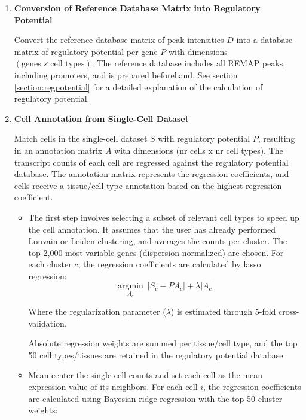 \begin{enumerate}
    \item \textbf{Conversion of Reference Database Matrix into Regulatory Potential}
    
    Convert the reference database matrix of peak intensities $D$ into a database matrix of regulatory potential\cite{Wang2016} per gene $P$ with dimensions $(\text{genes} \times \text{cell types})$. The reference database includes all REMAP peaks, including promoters, and is prepared beforehand. See section \ref{section:regpotential} for a detailed explanation of the calculation of regulatory potential.

    \item \textbf{Cell Annotation from Single-Cell Dataset}
    
    Match cells in the single-cell dataset $S$ with regulatory potential $P$, resulting in an annotation matrix $A$ with dimensions (nr cells x nr cell types). The transcript counts of each cell are regressed against the regulatory potential database. The annotation matrix represents the regression coefficients, and cells receive a tissue/cell type annotation based on the highest regression coefficient.
    
    \begin{itemize}
        \item The first step involves selecting a subset of relevant cell types to speed up the cell annotation. It assumes that the user has already performed Louvain or Leiden clustering, and averages the counts per cluster. The top 2,000 most variable genes (dispersion normalized) are chosen. For each cluster $c$, the regression coefficients are calculated by lasso regression:
        \begin{equation*}
            \underset{A_c}{\operatorname{argmin}}\ |S_c - P A_c| + \lambda |A_c|
        \end{equation*}

        Where the regularization parameter ($\lambda$) is estimated through 5-fold cross-validation.

        Absolute regression weights are summed per tissue/cell type, and the top 50 cell types/tissues are retained in the regulatory potential database.
        
        \item Mean center the single-cell counts and set each cell as the mean expression value of its neighbors. For each cell $i$, the regression coefficients are calculated using Bayesian ridge regression with the top 50 cluster weights:


\end{itemize}
\end{enumerate}

